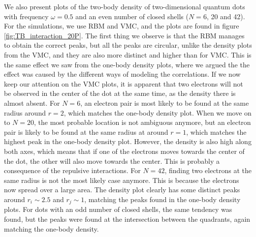 We also present plots of the two-body density of two-dimensional quantum dots with frequency $\omega=0.5$ and an even number of closed shells ($N=6$, 20 and 42). For the simulations, we use RBM and VMC, and the plots are found in figure \eqref{fig:TB_interaction_20P}. The first thing we observe is that the RBM manages to obtain the correct peaks, but all the peaks are circular, unlike the density plots from the VMC, and they are also more distinct and higher than for VMC. This is the same effect we saw from the one-body density plots, where we argued the the effect was caused by the different ways of modeling the correlations. If we now keep our attention on the VMC plots, it is apparent that two electrons will not be observed in the center of the dot at the same time, as the density there is almost absent. For $N=6$, an electron pair is most likely to be found at the same radius around $r=2$, which matches the one-body density plot. When we move on to $N=20$, the most probable location is not ambiguous anymore, but an electron pair is likely to be found at the same radius at around $r=1$, which matches the highest peak in the one-body density plot. However, the density is also high along both axes, which means that if one of the electrons moves towards the center of the dot, the other will also move towards the center. This is probably a consequence of the repulsive interactions. For $N=42$, finding two electrons at the same radius is not the most likely case anymore. This is because the electrons now spread over a large area. The density plot clearly has some distinct peaks around $r_i\sim 2.5$ and $r_j\sim 1$, matching the peaks found in the one-body density plots. For dots with an odd number of closed shells, the same tendency was found, but the peaks were found at the intersection between the quadrants, again matching the one-body density.

